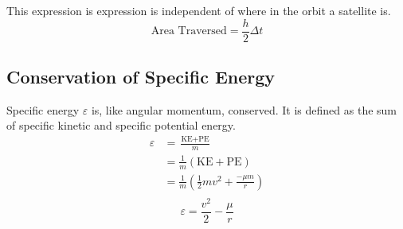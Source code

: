 \documentclass[../basicOrbitalDynamics.tex]{subfiles}
\begin{document}
This expression is expression is independent of where in the orbit a satellite is.
\begin{equation}\label{Kepler's First Law}
    \text{Area Traversed} = \frac{h}{2}\Delta{}t
\end{equation}

\bigskip\bigskip
\subsection{Conservation of Specific Energy}\label{sec:Conservation of Energy}

Specific energy $\varepsilon$ is, like angular momentum, conserved. It is defined as the sum of specific kinetic and specific potential energy.
\begin{align*}
    \varepsilon & =\frac{\text{KE}+\text{PE}}{m}                             \\
                & =\frac{1}{m}(\text{KE}+\text{PE})                          \\
                & =\frac{1}{m}\left(\frac{1}{2}mv^2+\frac{-\mu{}m}{r}\right) \\
\end{align*}
\begin{equation}\label{Specific Energy Physical}
    \varepsilon=\frac{v^2}{2}-\frac{\mu{}}{r}
\end{equation}
\end{document}
